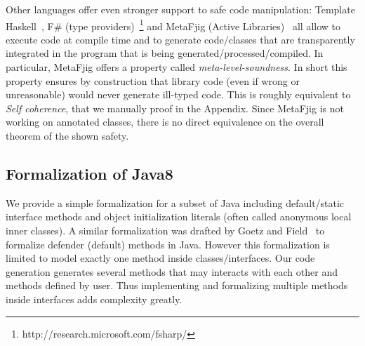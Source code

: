 Other languages offer even stronger support to safe code manipulation:
Template Haskell~\cite{sheard2002template}, F\# (type providers)~\footnote{http://research.microsoft.com/fsharp/} and MetaFjig (Active Libraries)~\cite{servetto2010metafjig}
all allow to execute code at compile time and to generate code/classes that are transparently integrated in the program that is being generated/processed/compiled.
In particular, MetaFjig offers a property called \emph{meta-level-soundness}. In short this property ensures by construction that library code (even if wrong or unreasonable) would never generate ill-typed code. This is roughly equivalent to 
\textit{Self coherence}, that we manually proof in the Appendix.
Since MetaFjig is not working on annotated classes, there is no direct
equivalence on the overall theorem of the shown safety.

\subsection{Formalization of Java8}
We provide a simple formalization for a subset of Java including default/static
interface methods and object initialization literals (often called anonymous
local inner classes).  A similar formalization was drafted by Goetz and
Field~\cite{goetz12fdefenders} to formalize defender (default) methods in
Java. However this formalization is limited to model exactly one method inside
classes/interfaces. Our code generation generates several methods that may
interacts with each other and methods defined by user. Thus implementing and
formalizing multiple methods inside interfaces adds complexity greatly.
